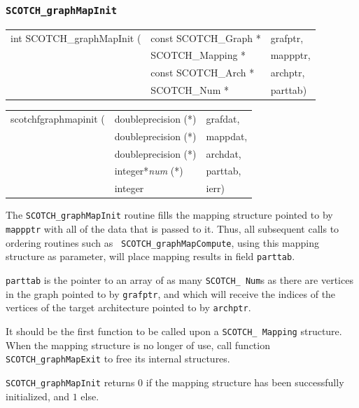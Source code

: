 \subsubsection{{\tt SCOTCH\_graphMapInit}}

\begin{itemize}
\progsyn

{\tt\begin{tabular}{l@{}ll}
int SCOTCH\_graphMapInit ( & const SCOTCH\_Graph * & grafptr, \\
                           & SCOTCH\_Mapping *     & mappptr, \\
                           & const SCOTCH\_Arch *  & archptr, \\
                           & SCOTCH\_Num *         & parttab)
\end{tabular}}

{\tt\begin{tabular}{l@{}ll}
scotchfgraphmapinit ( & doubleprecision (*)   & grafdat, \\
                      & doubleprecision (*)   & mappdat, \\
                      & doubleprecision (*)   & archdat, \\
                      & integer*{\it num} (*) & parttab, \\
                      & integer               & ierr)
\end{tabular}}

\progdes

The {\tt SCOTCH\_graphMapInit} routine fills the mapping structure
pointed to by {\tt mappptr} with all of the data that is passed to it.
Thus, all subsequent calls to ordering routines such as {\tt
SCOTCH\_\lbt graph\lbt Map\lbt Compute}, using this mapping structure
as parameter, will place mapping results in field {\tt parttab}.

{\tt parttab} is the pointer to an array of as many {\tt SCOTCH\_\lbt
Num}s as there are vertices in the graph pointed to by {\tt grafptr},
and which will receive the indices of the vertices of the target
architecture pointed to by {\tt archptr}.

It should be the first function to be called upon a {\tt SCOTCH\_\lbt
Mapping} structure. When the mapping structure is no longer of use,
call function {\tt SCOTCH\_graph\lbt \lbt Map\lbt Exit} to free its
internal structures.

\progret

{\tt SCOTCH\_graphMapInit} returns $0$ if the mapping structure has been
successfully initialized, and $1$ else.
\end{itemize}

